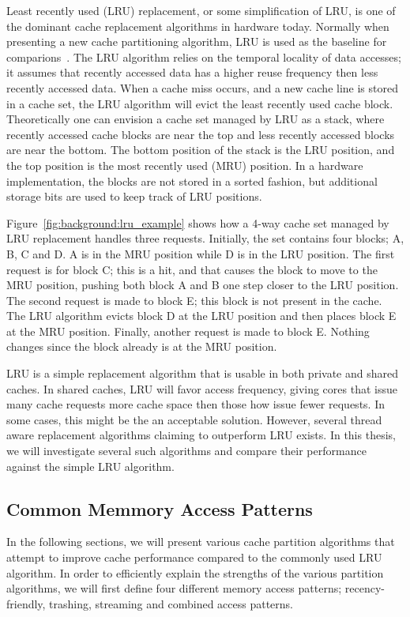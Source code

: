 Least recently used (LRU) replacement, or some simplification of LRU, is one of the dominant cache replacement algorithms in hardware today. 
Normally when presenting a new cache partitioning algorithm, LRU is used as the baseline for comparions~\cite{Jaleel2010,Qureshi2006,Qureshi2007}.
The LRU algorithm relies on the temporal locality of data accesses; it assumes that recently accessed data has a higher reuse frequency then less recently accessed data.
When a cache miss occurs, and a new cache line is stored in a cache set, the LRU algorithm will evict the least recently used cache block.
Theoretically one can envision a cache set managed by LRU as a stack, where recently accessed cache blocks are near the top and less recently accessed blocks are near the bottom.
The bottom position of the stack is the LRU position, and the top position is the most recently used (MRU) position. 
In a hardware implementation, the blocks are not stored in a sorted fashion, but additional storage bits are used to keep track of LRU positions.

Figure~\ref{fig:background:lru_example} shows how a 4-way cache set managed by LRU replacement handles three requests. 
Initially, the set contains four blocks; A, B, C and D. 
A is in the MRU position while D is in the LRU position.
The first request is for block C; this is a hit, and that causes the block to move to the MRU position, pushing both block A and B one step closer to the LRU position.
The second request is made to block E; this block is not present in the cache.
The LRU algorithm evicts block D at the LRU position and then places block E at the MRU position.
Finally, another request is made to block E. Nothing changes since the block already is at the MRU position.

LRU is a simple replacement algorithm that is usable in both private and shared caches.
In shared caches, LRU will favor access frequency, giving cores that issue many cache requests more cache space then those how issue fewer requests. 
In some cases, this might be the an acceptable solution. 
However, several thread aware replacement algorithms claiming to outperform LRU exists. 
In this thesis, we will investigate several such algorithms and compare their performance against the simple LRU algorithm.



\subsection{Common Memmory Access Patterns}
In the following sections, we will present various cache partition algorithms that attempt to improve cache performance compared to the commonly used LRU algorithm.
In order to efficiently explain the strengths of the various partition algorithms, we will first define four different memory access patterns; recency-friendly, trashing, streaming and combined access patterns.

